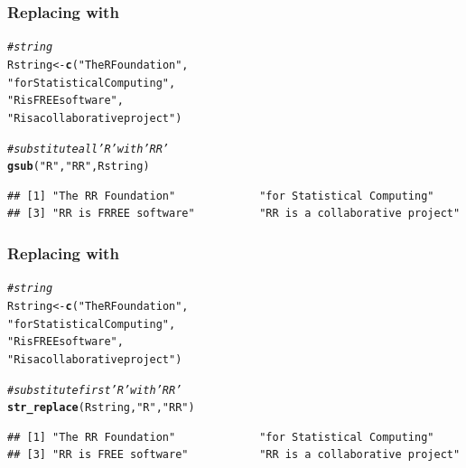 \documentclass[12pt]{beamer}\usepackage[]{graphicx}\usepackage[]{color}
\makeatletter
\newcommand{\hlstr}[1]{\textcolor[rgb]{0.192,0.494,0.8}{#1}}%
\newcommand{\hlcom}[1]{\textcolor[rgb]{0.678,0.584,0.686}{\textit{#1}}}%
\newcommand{\hlstd}[1]{\textcolor[rgb]{0.345,0.345,0.345}{#1}}%
\newcommand{\hlkwb}[1]{\textcolor[rgb]{0.69,0.353,0.396}{#1}}%
\newcommand{\hlkwd}[1]{\textcolor[rgb]{0.737,0.353,0.396}{\textbf{#1}}}%
\newenvironment{kframe}{%
 \def\at@end@of@kframe{}%
 \ifinner\ifhmode%
  \def\at@end@of@kframe{\end{minipage}}%
  \begin{minipage}{\columnwidth}%
 \fi\fi%
 \def\FrameCommand##1{\hskip\@totalleftmargin \hskip-\fboxsep
 \colorbox{shadecolor}{##1}\hskip-\fboxsep
     \hskip-\linewidth \hskip-\@totalleftmargin \hskip\columnwidth}%
 \MakeFramed {\advance\hsize-\width
   \@totalleftmargin\z@ \linewidth\hsize
   \@setminipage}}%
 {\par\unskip\endMakeFramed%
 \at@end@of@kframe}
\newenvironment{knitrout}{}{} %
\makeatother
\begin{document}

\begin{frame}[fragile]
\frametitle{Replacing with }

\begin{knitrout}\scriptsize
{}\color{fgcolor}\begin{kframe}
\begin{alltt}
\hlcom{# string}
\hlstd{Rstring} \hlkwb{<-} \hlkwd{c}\hlstd{(}\hlstr{"The R Foundation"}\hlstd{,}
            \hlstr{"for Statistical Computing"}\hlstd{,}
            \hlstr{"R is FREE software"}\hlstd{,}
            \hlstr{"R is a collaborative project"}\hlstd{)}

\hlcom{# substitute all 'R' with 'RR'}
\hlkwd{gsub}\hlstd{(}\hlstr{"R"}\hlstd{,} \hlstr{"RR"}\hlstd{, Rstring)}
\end{alltt}
\begin{verbatim}
## [1] "The RR Foundation"             "for Statistical Computing"    
## [3] "RR is FRREE software"          "RR is a collaborative project"
\end{verbatim}
\end{kframe}
\end{knitrout}

\end{frame}


\begin{frame}[fragile]
\frametitle{Replacing with }

\begin{knitrout}\scriptsize
{}\color{fgcolor}\begin{kframe}
\begin{alltt}
\hlcom{# string}
\hlstd{Rstring} \hlkwb{<-} \hlkwd{c}\hlstd{(}\hlstr{"The R Foundation"}\hlstd{,}
            \hlstr{"for Statistical Computing"}\hlstd{,}
            \hlstr{"R is FREE software"}\hlstd{,}
            \hlstr{"R is a collaborative project"}\hlstd{)}

\hlcom{# substitute first 'R' with 'RR'}
\hlkwd{str_replace}\hlstd{(Rstring,} \hlstr{"R"}\hlstd{,} \hlstr{"RR"}\hlstd{)}
\end{alltt}
\begin{verbatim}
## [1] "The RR Foundation"             "for Statistical Computing"    
## [3] "RR is FREE software"           "RR is a collaborative project"
\end{verbatim}
\end{kframe}
\end{knitrout}

\end{frame}
\end{document}
